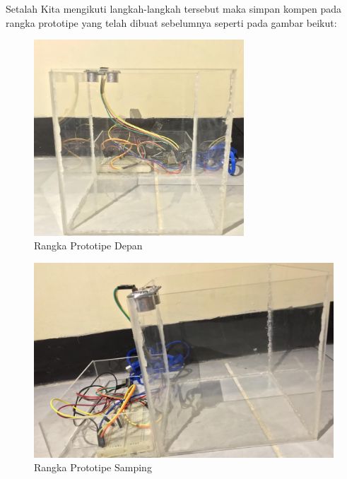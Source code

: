 Setalah Kita mengikuti langkah-langkah tersebut maka simpan kompen pada rangka prototipe yang telah dibuat sebelumnya seperti pada gambar beikut:
\begin{figure}[H]
\centering
\includegraphics[width=0.7\textwidth]{figures/alat1.jpeg}
\caption{Rangka Prototipe Depan }
\label{print}
\end{figure}

\begin{figure}[H]
\centering
\includegraphics[width=1\textwidth]{figures/alat2.jpeg}
\caption{Rangka Prototipe Samping }
\label{print}
\end{figure}

